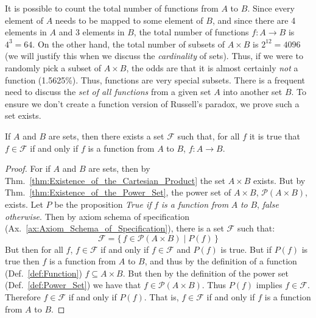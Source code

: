         It is possible to count the total number of functions from $A$ to $B$.
        Since every element of $A$ needs to be mapped to some element of $B$,
        and since there are 4 elements in $A$ and 3 elements in $B$, the total
        number of functions $f:A\rightarrow{B}$ is $4^{3}=64$. On the other
        hand, the total number of subsets of $A\times{B}$ is $2^{12}=4096$
        (we will justify this when we discuss the \textit{cardinality} of
        sets). Thus, if we were to randomly pick a subset of $A\times{B}$, the
        odds are that it is almost certainly \textit{not} a function
        (1.5625\%). Thus, functions are very special subsets.
        There is a frequent need to discuss the \textit{set of all functions}
        from a given set $A$ into another set $B$. To ensure we don't create
        a function version of Russell's paradox, we prove such a set exists.
        \begin{theorem}
            If $A$ and $B$ are sets, then there exists a set $\mathcal{F}$ such
            that, for all $f$ it is true that $f\in\mathcal{F}$ if and only if
            $f$ is a function from $A$ to $B$, $f:A\rightarrow{B}$.
        \end{theorem}
        \begin{proof}
            For if $A$ and $B$ are sets, then by
            Thm.~\ref{thm:Existence_of_the_Cartesian_Product} the set
            $A\times{B}$ exists. But by
            Thm.~\ref{thm:Existence_of_the_Power_Set}, the power set of
            $A\times{B}$, $\mathcal{P}(A\times{B})$, exists. Let $P$ be the
            proposition \textit{True if} $f$ \textit{is a function from} $A$
            \textit{to} $B$, \textit{false otherwise}. Then by axiom schema of
            specification (Ax.~\ref{ax:Axiom_Schema_of_Specification}), there is
            a set $\mathcal{F}$ such that:
            \begin{equation}
                \mathcal{F}=\big\{\,f\in\mathcal{P}(A\times{B})\;|
                    \;P(f)\,\big\}
            \end{equation}
            But then for all $f$, $f\in\mathcal{F}$ if and only if
            $f\in\mathcal{F}$ and $P(f)$ is true. But if $P(f)$ is true then
            $f$ is a function from $A$ to $B$, and thus by the definition of a
            function (Def.~\ref{def:Function}) $f\subseteq{A}\times{B}$. But
            then by the definition of the power set (Def.~\ref{def:Power_Set})
            we have that $f\in\mathcal{P}(A\times{B})$. Thus $P(f)$ implies
            $f\in\mathcal{F}$. Therefore $f\in\mathcal{F}$ if and only if
            $P(f)$. That is, $f\in\mathcal{F}$ if and only if $f$ is a function
            from $A$ to $B$.
        \end{proof}
